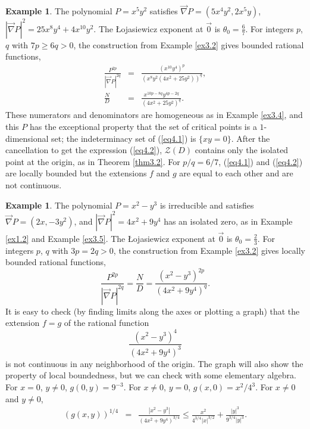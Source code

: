 \documentclass[12pt]{amsart}
\theoremstyle{definition}
\newtheorem{example}[thm]{Example}
\theoremstyle{remark}
\numberwithin{equation}{section}
\newcommand{\vv}{\mathcal{Z}}
\begin{document}
\begin{example}\label{ex4.6}
    The polynomial $P=x^5y^2$ satisfies $\vec\nabla P=(5x^4y^2,2x^5y)$, $|\vec\nabla P|^2=25x^8y^4+4x^{10}y^2$.  The \L ojasiewicz exponent at $\vec0$ is $\theta_0=\frac67$.  For integers $p$, $q$ with $7p\ge 6q>0$, the construction from Example \ref{ex3.2} gives bounded rational functions,
    \begin{eqnarray}
        \frac{P^{2p}}{|\vec\nabla P|^{2q}}&=&\frac{(x^{10}y^4)^p}{(x^8y^2(4x^2+25y^2))^q},\label{eq4.1}\\
        \frac ND&=&\frac{x^{10p-8q}y^{4p-2q}}{(4x^2+25y^2)^q}.\label{eq4.2}
    \end{eqnarray}  These numerators and denominators are homogeneous as in Example \ref{ex3.4}, and this $P$ has the exceptional property that the set of critical points is a $1$-dimensional set; the indeterminacy set of (\ref{eq4.1}) is $\{xy=0\}$.  After the cancellation to get the expression (\ref{eq4.2}), $\vv(D)$ contains only the isolated point at the origin, as in Theorem \ref{thm3.2}.  For $p/q=6/7$, (\ref{eq4.1}) and (\ref{eq4.2}) are locally bounded but the extensions $f$ and $g$ are equal to each other and are not continuous.
\end{example}



\begin{example}\label{ex4.7}
    The polynomial $P=x^2-y^3$ is irreducible and satisfies $\vec\nabla P=(2x,-3y^2)$, and $|\vec\nabla P|^2=4x^2+9y^4$ has an isolated zero, as in Example \ref{ex1.2} and Example \ref{ex3.5}.  The \L ojasiewicz exponent at $\vec0$ is $\theta_0=\frac23$.  For integers $p$, $q$ with $3p=2q>0$, the construction from Example \ref{ex3.2} gives locally bounded rational functions,
    \begin{equation*}
        \frac{P^{2p}}{|\vec\nabla P|^{2q}}=\frac ND=\frac{(x^2-y^3)^{2p}}{(4x^2+9y^4)^q}.
    \end{equation*} 
    It is easy to check (by finding limits along the axes or plotting a graph) that the extension $f=g$ of the rational function $$\displaystyle{\frac{(x^2-y^3)^{4}}{(4x^2+9y^4)^3}}$$ is not continuous in any neighborhood of the origin.  The graph will also show the property of local boundedness, but we can check with some elementary algebra.  For $x=0$, $y\ne0$, $g(0,y)=9^{-3}$.  For $x\ne0$, $y=0$, $g(x,0)=x^2/4^3$.  For $x\ne0$ and $y\ne0$,
    \begin{eqnarray*}
        (g(x,y))^{1/4}&=&\frac{|x^2-y^3|}{(4x^2+9y^4)^{3/4}}\le\frac{x^2}{4^{3/4}|x|^{3/2}}+\frac{|y|^3}{9^{3/4}|y|^3}.
    \end{eqnarray*}
\end{example}
\end{document}
